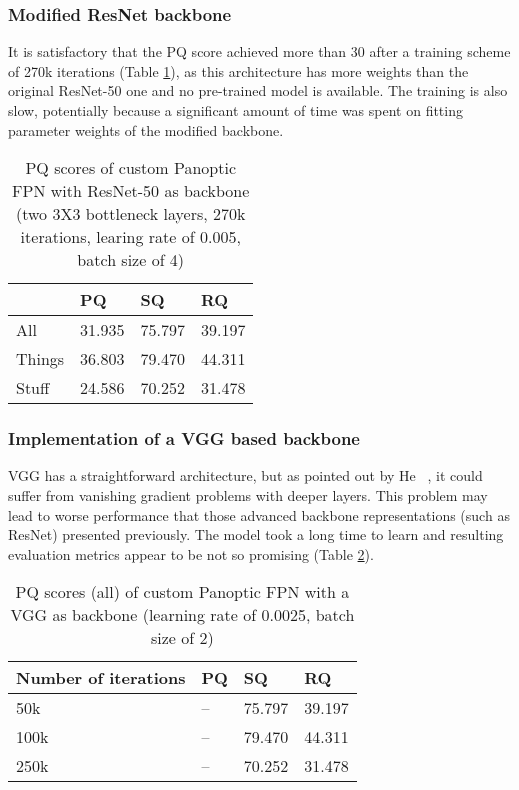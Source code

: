 \documentclass[10pt,twocolumn,letterpaper]{article}
\begin{document}
\subsubsection{Modified ResNet backbone}

It is satisfactory that the PQ score achieved more than 30 after a training scheme of 270k iterations (Table \ref{tab:mod_resnet}), as this architecture has more weights than the original ResNet-50 one and no pre-trained model is available. The training is also slow, potentially because a significant amount of time was spent on fitting parameter weights of the modified backbone. 

\begin{table}[htbp]\centering
\begin{tabular}{ || m{3em} | m{1cm}| m{1cm} | m{1cm} || } 
  \hline
   & PQ & SQ & RQ \\ 
  \hline
  All & 31.935 & 75.797 & 39.197 \\ 
  \hline
  Things & 36.803 & 79.470 & 44.311 \\ 
  \hline
  Stuff & 24.586 & 70.252 & 31.478 \\ 
  \hline
\end{tabular}
\caption{PQ scores of custom Panoptic FPN with ResNet-50 as backbone (two 3X3 bottleneck layers, 270k iterations, learing rate of 0.005, batch size of 4)}
\label{tab:mod_resnet}
\end{table}

\subsubsection{Implementation of a VGG based backbone}

VGG has a straightforward architecture, but as pointed out by He \etal~\cite{he2016deep}, it could suffer from vanishing gradient problems with deeper layers. This problem may lead to worse performance that those advanced backbone representations (such as ResNet) presented previously. The model took a long time to learn and resulting evaluation metrics appear to be not so promising (Table \ref{tab:vgg}).

\begin{table}[htbp]\centering
\begin{tabular}{ || m{9em} | m{1cm}| m{1cm} | m{1cm} || } 
  \hline
  Number of iterations & PQ & SQ & RQ \\ 
  \hline
  50k & -- & 75.797 & 39.197 \\ 
  \hline
  100k & -- & 79.470 & 44.311 \\ 
  \hline
  250k & -- & 70.252 & 31.478 \\ 
  \hline
\end{tabular}
\caption{PQ scores (all) of custom Panoptic FPN with a VGG as backbone (learning rate of 0.0025, batch size of 2)}
\label{tab:vgg}
\end{table}
\end{document}
